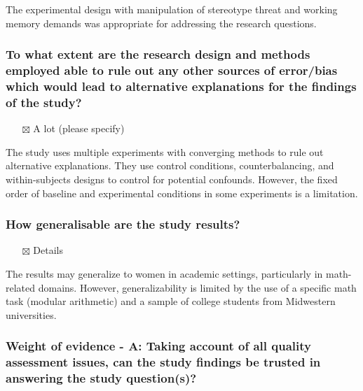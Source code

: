 \documentclass[
  doc, a4paper]{apa7}
\providecommand{\tightlist}{%
  \setlength{\itemsep}{0pt}\setlength{\parskip}{0pt}}
\begin{document}
The experimental design with manipulation of stereotype threat and working memory demands was appropriate for addressing the research questions.

\subsubsection{To what extent are the research design and methods employed able to rule out any other sources of error/bias which would lead to alternative explanations for the findings of the study?}\label{to-what-extent-are-the-research-design-and-methods-employed-able-to-rule-out-any-other-sources-of-errorbias-which-would-lead-to-alternative-explanations-for-the-findings-of-the-study}

\begin{itemize}
\tightlist
\item[$\boxtimes$]
  A lot (please specify)
\end{itemize}

The study uses multiple experiments with converging methods to rule out alternative explanations. They use control conditions, counterbalancing, and within-subjects designs to control for potential confounds. However, the fixed order of baseline and experimental conditions in some experiments is a limitation.

\subsubsection{How generalisable are the study results?}\label{how-generalisable-are-the-study-results}

\begin{itemize}
\tightlist
\item[$\boxtimes$]
  Details
\end{itemize}

The results may generalize to women in academic settings, particularly in math-related domains. However, generalizability is limited by the use of a specific math task (modular arithmetic) and a sample of college students from Midwestern universities.

\subsubsection{Weight of evidence - A: Taking account of all quality assessment issues, can the study findings be trusted in answering the study question(s)?}\label{weight-of-evidence---a-taking-account-of-all-quality-assessment-issues-can-the-study-findings-be-trusted-in-answering-the-study-questions}
\end{document}
